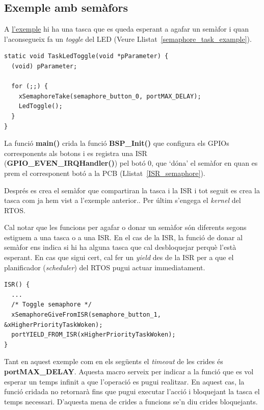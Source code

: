 \subsection{Exemple amb semàfors}
\label{sub:semafors_exemple}
A \href{https://github.com/mariusmm/cursembedded/tree/master/Simplicity/FreeRTOS_Semaphore}{l'exemple} hi ha una tasca que es queda esperant a agafar un semàfor i quan l'aconsegueix fa un {\em toggle} del LED (Veure Llistat~\ref{semaphore_task_example}).

\begin{lstlisting}[style=customc,caption=Tasca amb semàfor d'exemple,label=semaphore_task_example]
static void TaskLedToggle(void *pParameter) {
  (void) pParameter;

  for (;;) {
    xSemaphoreTake(semaphore_button_0, portMAX_DELAY);
    LedToggle();
  }
}
\end{lstlisting}

La funció {\bf main()} crida la funció {\bf BSP\_Init()} que configura els GPIOs corresponents als botons i es registra una \gls{ISR} ({\bf GPIO\_EVEN\_IRQHandler()}) pel botó 0, que ‘dóna' el semàfor en quan es prem el corresponent botó a la PCB (Llistat~\ref{ISR_semaphore}).

Després es crea el semàfor que compartiran la tasca i la ISR i tot seguit es crea la tasca com ja hem vist a l'exemple anterior..
Per últim s'engega el {\em kernel} del RTOS.

Cal notar que les funcions per agafar o donar un semàfor són diferents segons estiguem a una tasca o a una \gls{ISR}. En el cas de la ISR, la funció de donar al semàfor ens indica si hi ha alguna tasca que cal desbloquejar perquè l'està esperant. En cas que sigui cert, cal fer un {\em yield} des de la \gls{ISR} per a que el planificador ({\em scheduler}) del RTOS pugui actuar immediatament.

\begin{lstlisting}[caption=ISR del botó 0,style=customc,label=ISR_semaphore]
ISR() {
  ...
  /* Toggle semaphore */
  xSemaphoreGiveFromISR(semaphore_button_1, &xHigherPriorityTaskWoken);
  portYIELD_FROM_ISR(xHigherPriorityTaskWoken);
}
\end{lstlisting}

Tant en aquest exemple com en els següents el {\em timeout} de les crides és {\bf portMAX\_DELAY}. Aquesta macro serveix per indicar a la funció que es vol esperar un temps infinit a que l'operació es pugui realitzar. En aquest cas, la funció cridada no retornarà fins que pugui executar l'acció i bloquejant la tasca el temps necessari. D'aquesta mena de crides a funcions se'n diu crides bloquejants.

